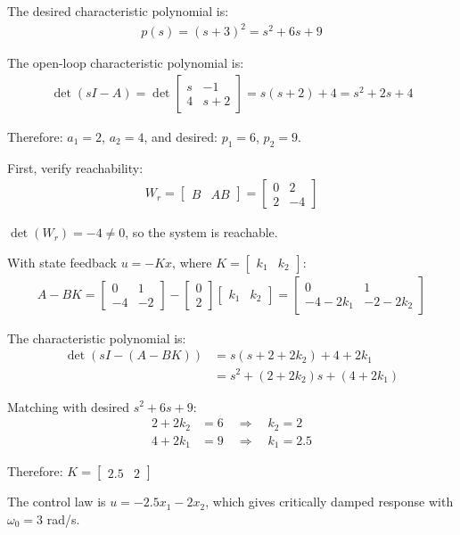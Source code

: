\documentclass[11pt,a4paper]{article}
\begin{document}
The desired characteristic polynomial is:
\begin{align}
  p(s) = (s+3)^2 = s^2 + 6s + 9
\end{align}

The open-loop characteristic polynomial is:
\begin{align}
  \det(sI - A) = \det\begin{bmatrix} s & -1 \\ 4 & s+2 \end{bmatrix} = s(s+2) + 4 = s^2 + 2s + 4
\end{align}

Therefore: $a_1 = 2$, $a_2 = 4$, and desired: $p_1 = 6$, $p_2 = 9$.

First, verify reachability:
\begin{align}
  W_r = \begin{bmatrix} B & AB \end{bmatrix} = \begin{bmatrix} 0 & 2 \\ 2 & -4 \end{bmatrix}
\end{align}

$\det(W_r) = -4 \neq 0$, so the system is reachable.

With state feedback $u = -Kx$, where $K = \begin{bmatrix} k_1 & k_2 \end{bmatrix}$:
\begin{align}
  A - BK = \begin{bmatrix} 0 & 1 \\ -4 & -2 \end{bmatrix} - \begin{bmatrix} 0 \\ 2 \end{bmatrix}\begin{bmatrix} k_1 & k_2 \end{bmatrix} = \begin{bmatrix} 0 & 1 \\ -4-2k_1 & -2-2k_2 \end{bmatrix}
\end{align}

The characteristic polynomial is:
\begin{align}
  \det(sI - (A-BK)) &= s(s+2+2k_2) + 4+2k_1 \\
  &= s^2 + (2+2k_2)s + (4+2k_1)
\end{align}

Matching with desired $s^2 + 6s + 9$:
\begin{align}
  2 + 2k_2 &= 6 \quad \Rightarrow \quad k_2 = 2 \\
  4 + 2k_1 &= 9 \quad \Rightarrow \quad k_1 = 2.5
\end{align}

Therefore: $K = \begin{bmatrix} 2.5 & 2 \end{bmatrix}$

The control law is $u = -2.5x_1 - 2x_2$, which gives critically damped response with $\omega_0 = 3$ rad/s.
\end{document}
